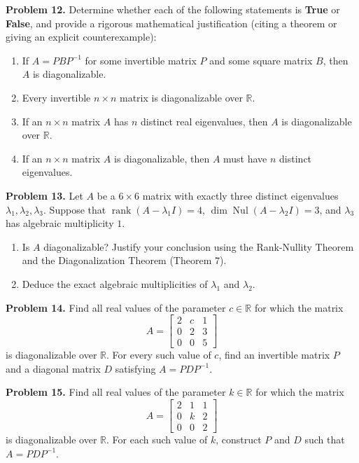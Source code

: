 \documentclass[11pt, letterpaper]{article}
\theoremstyle{definition}
\theoremstyle{remark}
\begin{document}
\textbf{Problem 12.}\label{prob:12}
Determine whether each of the following statements is \textbf{True} or \textbf{False}, and provide a rigorous mathematical justification (citing a theorem or giving an explicit counterexample):
\begin{enumerate}[label=(\alph*)]
    \item If $A = PBP^{-1}$ for some invertible matrix $P$ and some square matrix $B$, then $A$ is diagonalizable.
    \item Every invertible $n \times n$ matrix is diagonalizable over $\mathbb{R}$.
    \item If an $n \times n$ matrix $A$ has $n$ distinct real eigenvalues, then $A$ is diagonalizable over $\mathbb{R}$.
    \item If an $n \times n$ matrix $A$ is diagonalizable, then $A$ must have $n$ distinct eigenvalues.
\end{enumerate}

\textbf{Problem 13.}\label{prob:13}
Let $A$ be a $6 \times 6$ matrix with exactly three distinct eigenvalues $\lambda_1, \lambda_2, \lambda_3$. Suppose that $\operatorname{rank}(A - \lambda_1 I) = 4$, $\dim\operatorname{Nul}(A - \lambda_2 I) = 3$, and $\lambda_3$ has algebraic multiplicity $1$.
\begin{enumerate}[label=(\alph*)]
    \item Is $A$ diagonalizable? Justify your conclusion using the Rank-Nullity Theorem and the Diagonalization Theorem (Theorem 7).
    \item Deduce the exact algebraic multiplicities of $\lambda_1$ and $\lambda_2$.
\end{enumerate}

\textbf{Problem 14.}\label{prob:14}
Find all real values of the parameter $c \in \mathbb{R}$ for which the matrix
\[
A = \begin{bmatrix} 2 & c & 1 \\ 0 & 2 & 3 \\ 0 & 0 & 5 \end{bmatrix}
\]
is diagonalizable over $\mathbb{R}$. For every such value of $c$, find an invertible matrix $P$ and a diagonal matrix $D$ satisfying $A = PDP^{-1}$.

\textbf{Problem 15.}\label{prob:15}
Find all real values of the parameter $k \in \mathbb{R}$ for which the matrix
\[
A = \begin{bmatrix} 2 & 1 & 1 \\ 0 & k & 2 \\ 0 & 0 & 2 \end{bmatrix}
\]
is diagonalizable over $\mathbb{R}$. For each such value of $k$, construct $P$ and $D$ such that $A = PDP^{-1}$.
\end{document}
